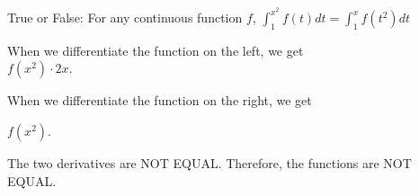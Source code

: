 \documentclass{ximera}
\author{Steven Gubkin}
\begin{document}
\begin{exercise}

True or False:  For any continuous function $f$, $\int_1^{x^2} f(t) dt = \int_1^x f(t^2) dt$

\begin{hint}

When we differentiate the function on the left, we get\\

$f(x^2)\cdot2x$.



When we differentiate the function on the right, we get

$f(x^2)$.


The two derivatives are NOT EQUAL.
Therefore, the functions are NOT EQUAL.
\end{hint}
\begin{prompt}
	\begin{multipleChoice}
	\end{multipleChoice}
\end{prompt}

\end{exercise}
\end{document}
